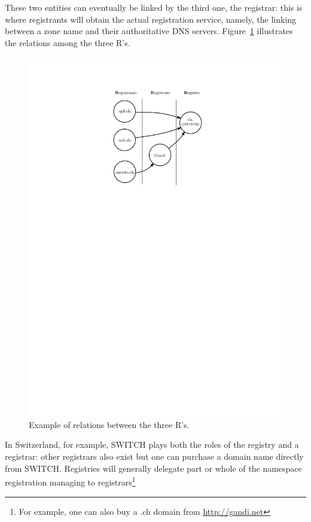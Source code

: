 \documentclass[a4paper,twocolumn]{scrartcl}
\begin{document}
These two entities can eventually be linked by the third one, the registrar: this is where registrants will obtain the actual registration service, namely, the linking between a zone name and their authoritative DNS servers. Figure~\ref{fig:3Rs} illustrates the relations among the three R's.

\begin{figure}
\center
  \includegraphics[width=\linewidth]{3Rs}
  \caption{Example of relations between the three R's.}
  \label{fig:3Rs}
\end{figure}

In Switzerland, for example, SWITCH plays both the roles of the registry and a registrar: other registrars also exist but one can purchase a domain name directly from SWITCH. Registries will generally delegate part or whole of the namespace registration managing to registrars\footnote{For example, one can also buy a .ch domain from \url{http://gandi.net}}
\end{document}

